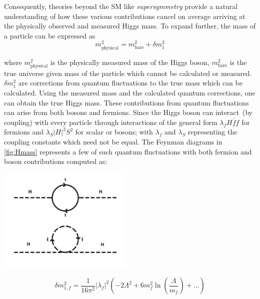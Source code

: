 Consequently, theories beyond the SM like \textit{supersymmetry} provide a natural understanding of how these various contributions cancel on average arriving at the physically observed and measured Higgs mass. To expand further, the mass of a particle can be expressed as 
\begin{equation}
 m^{2}_{\mbox{physical}} = m^{2}_{\mbox{bare}} + \delta m^{2}_{1}
\end{equation}

where $m^{2}_{\mbox{physical}}$ is the physically measured mass of the Higgs boson,  $m^{2}_{\mbox{bare}}$ is the true  universe given mass of the particle which cannot be calculated or measured. $\delta m^{2}_{1}$ are corrections from quantum fluctuations to the true mass which can be calculated. Using the measured mass and the calculated  quantum corrections, one can obtain the true Higgs mass. These contributions from quantum fluctuations can arise from both bosons and fermions. Since the Higgs boson can interact~(by coupling) with every particle through interactions of the general form $\lambda_{f}H\bar{f}f$ for fermions and $\lambda_{S}|H|^{2}S^{2}$ for scalar or bosons;  with $\lambda_{f}$ and $\lambda_{S}$ representing the coupling constants which need not be equal. The Feynman diagrams in \ref{fig:Hmass} represents a few of such quantum fluctuations with both fermion and boson contributions computed as:

\begin{center}
\includegraphics[height=5cm,width=0.5\linewidth]{THESISPLOTS/Higgs_Hirrachy_Problem.png}
\label{fig:Hmass}
\end{center}

\begin{equation}
\delta m^{2}_{1,f} = \frac{1}{16\pi^{2}}|\lambda_{f}|^{2}\left(-2\Lambda^{2} + 6m^{2}_{f}\ln\left(\frac{\Lambda}{m_{f}}\right) + ...\right) 
\end{equation}

